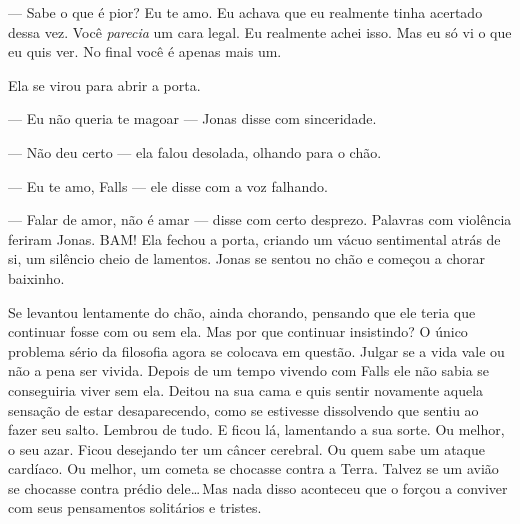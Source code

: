 --- Sabe o que é pior? Eu te amo. Eu achava que eu realmente tinha acertado dessa vez. Você \emph{parecia} um cara legal. Eu realmente achei isso. Mas eu só vi o que eu quis ver. No final você é apenas mais um.

Ela se virou para abrir a porta.

--- Eu não queria te magoar ---  Jonas disse\mudanca{,} com sinceridade.

--- Não deu certo --- ela falou desolada, olhando para o chão.

--- Eu te amo, Falls --- ele disse\mudanca{,} com a voz falhando.

--- Falar de amor, não é amar --- disse com certo desprezo. Palavras com violência feriram Jonas. BAM! Ela fechou a porta, criando um vácuo sentimental atrás de si, um silêncio cheio de lamentos. Jonas se sentou no chão e começou a chorar baixinho.

Se levantou lentamente do chão, ainda chorando, pensando que ele teria que continuar fosse com ou sem ela. Mas por que continuar insistindo? O único problema sério da filosofia agora se colocava em questão. Julgar se a vida vale ou não a pena ser vivida. Depois de um tempo vivendo com Falls\mudanca{,} ele não sabia se conseguiria viver sem ela. Deitou na sua cama e quis sentir novamente aquela sensação de estar desaparecendo, como se estivesse dissolvendo\mudanca{,} que sentiu ao fazer seu salto. Lembrou de tudo. E ficou lá, lamentando a sua sorte. Ou melhor, o seu azar. Ficou desejando ter um câncer cerebral. Ou quem sabe um ataque cardíaco. Ou melhor, um cometa se chocasse contra a Terra. Talvez se um avião se chocasse contra  prédio dele\ldots\,Mas nada disso aconteceu que o forçou a conviver com seus pensamentos solitários e tristes.
